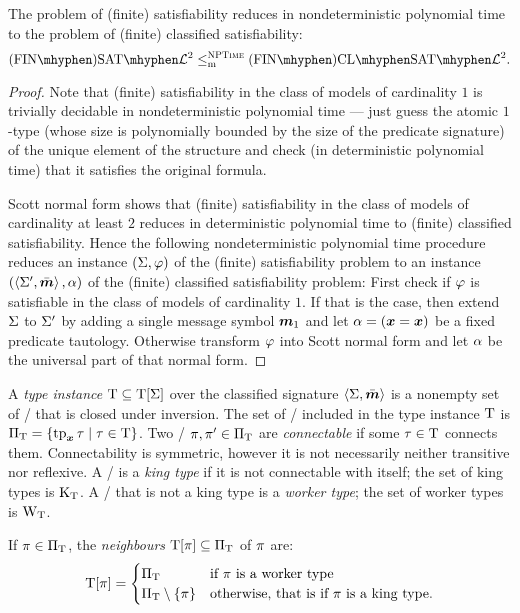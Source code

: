 \begin{remark}
The problem of (finite) satisfiability reduces in nondeterministic polynomial
time to the problem of (finite) classified satisfiability:
\[
  \FinASat{\vFo2} \red\cNP \FinAClSat{\vFo2}.
\]
\end{remark}
\begin{proof}

Note that (finite) satisfiability in the class of models of cardinality $1$ is
trivially decidable in nondeterministic polynomial time --- just guess the
atomic $1$-type (whose size is polynomially bounded by the size of the
predicate signature) of the unique element of the structure and check (in
deterministic polynomial time) that it satisfies the original formula.

Scott normal form shows that (finite) satisfiability in the class of models of
cardinality at least $2$ reduces in deterministic polynomial time to (finite)
classified satisfiability.
Hence the following nondeterministic polynomial time procedure reduces an
instance $(\mathrm{\Sigma}, \varphi)$ of the (finite) satisfiability problem to an instance
$(\left\langle \mathrm{\Sigma'},\bar{\bm{m}} \right\rangle, \alpha)$ of the (finite) classified satisfiability problem:
First check if $\varphi$ is satisfiable in the class of models of cardinality $1$.
If that is the case, then extend $\mathrm{\Sigma}$ to $\mathrm{\Sigma'}$ by adding a single message
symbol $\bm{m}_{1}$ and let $\alpha = (\bm{x} = \bm{x})$ be a fixed predicate tautology.
Otherwise transform $\varphi$ into Scott normal form and let $\alpha$ be the
universal part of that normal form.
\end{proof}

A \emph{type instance} $\mathrm{T} \subseteq \mathrm{T}[\mathrm{\Sigma}]$ over the classified signature
$\left\langle \mathrm{\Sigma},\bar{\bm{m}} \right\rangle$ is a nonempty set of \twotypes/ that is closed under
inversion.
The set of \onetypes/ included in the type instance $\mathrm{T}$ is
${\Pi}_{\mathrm{T}} = \left\{\operatorname{tp}_{\bm{x}}\tau\mathrel{}\middle|\mathrel{}\tau\in\mathrm{T}\right\}$.
Two \onetypes/ $\pi,{\pi'} \in {\Pi}_{\mathrm{T}}$ are \emph{connectable} if some
$\tau\in\mathrm{T}$ connects them.
Connectability is symmetric, however it is not necessarily neither transitive
nor reflexive.
A \onetype/ is a \emph{king type} if it is not connectable with itself;
the set of king types is ${\mathrm{K}}_{\mathrm{T}}$.
A \onetype/ that is not a king type is a \emph{worker type};
the set of worker types is ${\mathrm{W}}_{\mathrm{T}}$.

If $\pi\in{\Pi}_{\mathrm{T}}$, the \emph{neighbours} $\mathrm{T}[\pi]\subseteq{\Pi}_{\mathrm{T}}$ of $\pi$
are:
\[
  \mathrm{T}[\pi] = \begin{cases}
    {\Pi}_{\mathrm{T}} &\text{if } \pi \text{ is a worker type} \\
    {\Pi}_{\mathrm{T}} \setminus \left\{\pi\right\} &\text{otherwise, that is if } \pi \text{ is a king
    type.}
  \end{cases}
\]

